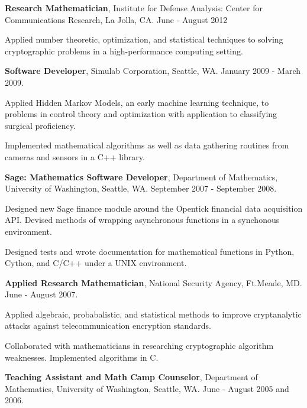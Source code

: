 \documentclass{article}
\begin{document}
\begin{itemize*}
  \setlength{\itemsep}{0pt}
  \item {\bf Research Mathematician}, Institute for Defense Analysis:
    Center for Communications Research, La Jolla, CA. June - August
    2012
    \begin{itemize*}
    \item Applied number theoretic, optimization, and statistical techniques to
      solving cryptographic problems in a high-performance computing setting.
    \end{itemize*}
  \item {\bf Software Developer}, Simulab Corporation, Seattle,
    WA. January 2009 - March 2009.
    \begin{itemize*}
    \item Applied Hidden Markov Models, an early machine learning technique, to
      problems in control theory and optimization with application to
      classifying surgical proficiency.
    \item Implemented mathematical algorithms as well as data gathering routines
      from cameras and sensors in a C++ library.
    \end{itemize*}
  \item {\bf Sage: Mathematics Software Developer}, Department of
    Mathematics, University of Washington, Seattle, WA. September 2007
    - September 2008.
    \begin{itemize*}
    \item Designed new Sage finance module around the Opentick financial data
      acquisition API. Devised methods of wrapping asynchronous functions in a
      synchonous environment.
    \item Designed tests and wrote documentation for mathematical functions in
      Python, Cython, and C/C++ under a UNIX environment.
    \end{itemize*}
  \item {\bf Applied Research Mathematician}, National Security Agency,
    Ft.Meade, MD. June - August 2007.
    \begin{itemize*}
    \item Applied algebraic, probabalistic, and statistical methods to improve
      cryptanalytic attacks against telecommunication encryption standards.
    \item Collaborated with mathematicians in researching cryptographic
      algorithm weaknesses. Implemented algorithms in C.
    \end{itemize*}
  \item {\bf Teaching Assistant and Math Camp Counselor}, Department of
    Mathematics, University of Washington, Seattle, WA. June - August
    2005 and 2006.
\end{itemize*}
\end{document}
